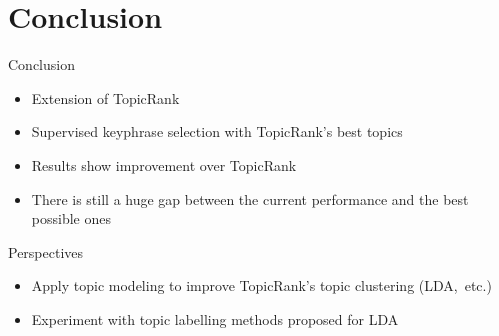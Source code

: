 \section{Conclusion}
  \begin{frame}{Conclusion}
    \begin{itemize}
      \item{Extension of TopicRank}
      \item{Supervised keyphrase selection with TopicRank's best topics}
      \item{Results show improvement over TopicRank}
      \item{There is still a huge gap between the current performance and the
            best possible ones}
    \end{itemize}
  \end{frame}

  \begin{frame}{Perspectives}
    \begin{itemize}
      \item{Apply topic modeling to improve TopicRank's topic clustering
            (LDA,~etc.)}
      \item{Experiment with topic labelling methods proposed for LDA}
    \end{itemize}
  \end{frame}

